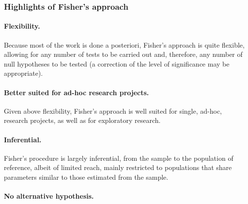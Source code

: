 \documentclass[
]{book}
\theoremstyle{definition}
\theoremstyle{definition}
\theoremstyle{definition}
\theoremstyle{definition}
\theoremstyle{remark}
\begin{document}
\hypertarget{highlights-of-fishers-approach}{%
\subsubsection*{Highlights of Fisher's approach}\label{highlights-of-fishers-approach}}

\hypertarget{flexibility.}{%
\paragraph*{Flexibility.}\label{flexibility.}}

Because most of the work is done a posteriori, Fisher's approach is quite flexible, allowing for any number of tests to be carried out and, therefore, any number of null hypotheses to be tested (a correction of the level of significance may be appropriate).

\hypertarget{better-suited-for-ad-hoc-research-projects.}{%
\paragraph*{Better suited for ad-hoc research projects.}\label{better-suited-for-ad-hoc-research-projects.}}

Given above flexibility, Fisher's approach is well suited for single, ad-hoc, research projects, as well as for exploratory research.

\hypertarget{inferential.}{%
\paragraph*{Inferential.}\label{inferential.}}

Fisher's procedure is largely inferential, from the sample to the population of reference, albeit of limited reach, mainly restricted to populations that share parameters similar to those estimated from the sample.

\hypertarget{no-alternative-hypothesis.}{%
\paragraph*{No alternative hypothesis.}\label{no-alternative-hypothesis.}}
\end{document}
